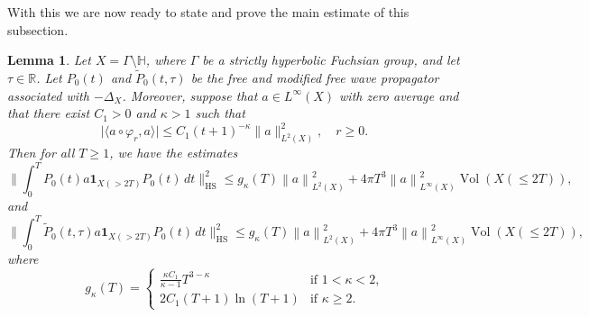 \documentclass[11pt,twoside,reqno]{amsart}
\newcommand{\R}{\mathbb{R}}
\newcommand{\bH}{\mathbb{H}}
\renewcommand{\phi}{\varphi}
\newcommand{\1}{\mathrm{\mathbf{1}}}
\newcommand{\bHS}{\mathrm{HS}}
\DeclareMathOperator{\vol}{Vol}
\newcommand{\norm}[1]{\left\lVert#1\right\rVert}
\numberwithin{equation}{section}
\theoremstyle{plain}
\newtheorem{lemma}[thm]{Lemma}
\theoremstyle{definition}
\theoremstyle{remark}
\begin{document}
With this we are now ready to state and prove the main estimate of this subsection.

\begin{lemma}\label{LE:free_HS_est_exponential_mixing}
Let $X=\Gamma\setminus \bH$, where $\Gamma$ be a strictly hyperbolic Fuchsian group, and let $\tau\in\R$. Let $P_0(t)$ and $\widetilde{P}_0(t,\tau)$ be the free and modified free wave propagator associated with $-\Delta_X$. Moreover, suppose that $a\in L^\infty(X)$ with zero average and that there exist $C_1>0$ and $\kappa>1$ such that  
\begin{equation}\label{LEEQ:free_HS_est_exponential_mixing_1}
  \big|\langle a \circ \phi_r, a \rangle \big| \leq C_1 (t+1)^{-\kappa} \lVert a \rVert_{L^2(X)}^2,\quad r \geq 0.  
\end{equation}
%
Then for all $T\geq 1$, we have the estimates
%
\begin{equation*}
       \Big\lVert \int_0^T  P_0(t) a \boldsymbol{1}_{X( > 2T)} P_0(t) \,d t  \Big\rVert_{\bHS}^2 \leq g_\kappa(T) \norm{a}^2_{L^2(X)}+  4\pi T^3 \norm{a}_{L^\infty(X)}^2 \vol(X(\leq 2T)),
\end{equation*}
and 
\begin{equation*}
       \Big\lVert \int_0^T  \widetilde{P}_0(t,\tau) a \boldsymbol{1}_{X( > 2T)} P_0(t) \,d t  \Big\rVert_{\bHS}^2 \leq g_\kappa(T) \norm{a}^2_{L^2(X)}+  4\pi T^3 \norm{a}_{L^\infty(X)}^2 \vol(X(\leq 2T)),
\end{equation*}
where 
\begin{equation*}
    g_\kappa(T) = \begin{cases}
        \frac{\kappa C_1}{\kappa -1} T^{3-\kappa} & \text{if $1<\kappa<2$,}\\
        2 C_1(T+1)\ln (T+1) & \text{if $\kappa\geq 2$.}
    \end{cases}        
\end{equation*}
\end{lemma}
\end{document}

